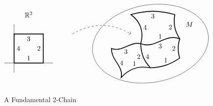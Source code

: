 \documentclass[../../main]{subfiles}
\begin{document}
\begin{figure}[ht]
\[
\begin{tikzpicture}
    \begin{scope}
    \draw (0.75,2.5) node {$\bR^2$};
    
    \draw (-0.5,0)--(2,0);
    \draw (0,-0.5)--(0,2);
    
    \draw[very thick]
        (0,0) 
        to node[midway, anchor=south]{1}
        (1.5,0)
        to node[midway, anchor=east]{2}
        (1.5,1.5)
        to node[midway, anchor=north]{3}
        (0,1.5)
        to node[midway, anchor=west]{4}
        (0,0);
    \end{scope}
    
    \begin{scope}[shift={(7,1)}]
    \draw[rotate=10] (0,0) ellipse (3cm and 2cm);
    \draw (2,1) node {$M$};
    
    \draw[dashed, ->] (-4,0.5) to[bend left] (-1,0.5);
    
    \draw[very thick]
        (-0.5,0)
        to[out=-30, in=150, relative]
            node[midway, anchor=south]{1}
            node[midway, anchor=north]{3}
        (1.5,0.25)
        to[bend left=20] node[midway, anchor=east]{2}
        (1.25,1.5)
        to[bend right=15] node[midway, anchor=north]{3}
        (-1,1.5)
        to[bend left=35] node[midway, anchor=west]{4}
        (-0.5,0);
    
    \draw[very thick]
        (-0.5,0)
        to[bend right=20]
            node[midway, anchor=west]{4}
            node[midway, anchor=east]{2}
        (0,-1.25)
        to[bend right=15] node[midway, anchor=south]{1}
        (1.5,-0.75)
        to[bend left=15] node[midway, anchor=east]{2}
        (1.5,0.25);
        
    \draw[very thick]
        (-0.5,0)
        to[out=-20, in=150, relative]
            node[midway, anchor=north]{3}
        (-2,-0.25)
        to[out=-20, in=150, relative]
            node[midway, anchor=west]{4}
        (-1.5,-1.75)
        to[bend left] node[midway, anchor=south]{1}
        (0,-1.25);
    \end{scope}
\end{tikzpicture}
\]
\caption{A Fundamental 2-Chain}
\label{fig:ch07fig1}
\end{figure}
\end{document}
